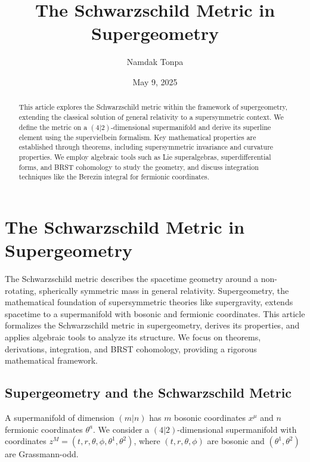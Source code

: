 \documentclass{article}
\theoremstyle{plain}
\newcommand{\supercoords}{z^{M}}
\newcommand{\boscoords}{x^{\mu}}
\newcommand{\fermcoords}{\theta^{a}}
\begin{document}
\title{The Schwarzschild Metric in Supergeometry}
\author{Namdak Tonpa}
\date{May 9, 2025}

\maketitle

\begin{abstract}
This article explores the Schwarzschild metric within the framework of supergeometry, extending the classical solution of general relativity to a supersymmetric context. We define the metric on a $(4|2)$-dimensional supermanifold and derive its superline element using the supervielbein formalism. Key mathematical properties are established through theorems, including supersymmetric invariance and curvature properties. We employ algebraic tools such as Lie superalgebras, superdifferential forms, and BRST cohomology to study the geometry, and discuss integration techniques like the Berezin integral for fermionic coordinates.
\end{abstract}

\section{The Schwarzschild Metric in Supergeometry}

The Schwarzschild metric describes the spacetime geometry around a non-rotating, spherically symmetric mass in general relativity. Supergeometry, the mathematical foundation of supersymmetric theories like supergravity, extends spacetime to a supermanifold with bosonic and fermionic coordinates. This article formalizes the Schwarzschild metric in supergeometry, derives its properties, and applies algebraic tools to analyze its structure. We focus on theorems, derivations, integration, and BRST cohomology, providing a rigorous mathematical framework.

\subsection{Supergeometry and the Schwarzschild Metric}

A supermanifold of dimension $(m|n)$ has $m$ bosonic coordinates $\boscoords$ and $n$ fermionic coordinates $\fermcoords$. We consider a $(4|2)$-dimensional supermanifold with coordinates $\supercoords = (t, r, \theta, \phi, \theta^{1}, \theta^{2})$, where $(t, r, \theta, \phi)$ are bosonic and $(\theta^{1}, \theta^{2})$ are Grassmann-odd.
\end{document}
